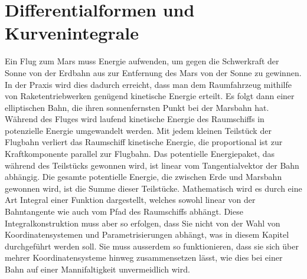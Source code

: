 %
%
%
\chapter{Differentialformen und Kurvenintegrale
\label{chapter:kurvenintegral}}

\noindent
Ein Flug zum Mars muss Energie aufwenden, um gegen die Schwerkraft der
Sonne von der Erdbahn aus zur Entfernung des Mars von der Sonne zu
gewinnen.
%
%
In der Praxis wird dies dadurch erreicht, dass man dem Raumfahrzeug
mithilfe von Raketentriebwerken genügend kinetische Energie erteilt.
%
%
Es folgt dann einer elliptischen Bahn, die ihren sonnenfernsten Punkt
bei der Marsbahn hat.
%
%
Während des Fluges wird laufend kinetische Energie des Raumschiffs in
potenzielle Energie umgewandelt werden.
Mit jedem kleinen Teilstück der Flugbahn verliert das Raumschiff 
kinetische Energie, die proportional ist zur Kraftkomponente parallel
zur Flugbahn. 
Das potentielle Energiepaket, das während des Teilstücks gewonnen wird,
ist linear vom Tangentialvektor der Bahn abhängig.
Die gesamte potentielle Energie, die zwischen Erde und Marsbahn
gewonnen wird, ist die Summe dieser Teilstücke.
Mathematisch wird es durch eine Art Integral einer Funktion dargestellt,
welches sowohl linear von der Bahntangente wie auch vom Pfad des
Raumschiffs abhängt.
Diese Integralkonstruktion muss aber so erfolgen, dass Sie nicht von der
Wahl von Koordinatensystemen und Parametrisierungen abhängt, was in
diesem Kapitel durchgeführt werden soll.
Sie muss ausserdem so funktionieren, dass sie sich über mehrer
Koordinatensysteme hinweg zusammensetzen lässt, wie dies bei einer
Bahn auf einer Mannifaltigkeit unvermeidlich wird.






\uebungsabschnitt

\begin{uebungsaufgaben}
\end{uebungsaufgaben}
\enduebungsabschnitt

